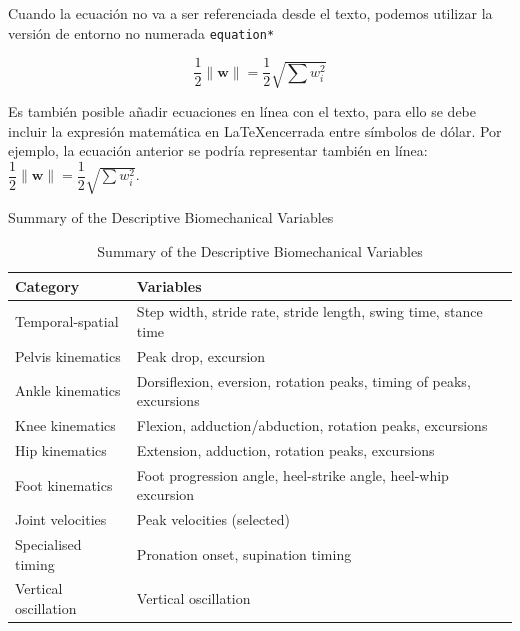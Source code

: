Cuando la ecuación no va a ser referenciada desde el texto, podemos utilizar la versión de entorno no numerada \verb|equation*|

\begin{equation*}
\label{Eq:ejemplo_ecuacion2}
\dfrac{1}{2}\parallel\mathbf{w}\parallel=\dfrac{1}{2}\sqrt{\sum w_{i}^{2}}
\end{equation*}

Es también posible añadir ecuaciones en línea con el texto, para ello se debe incluir la expresión matemática en \LaTeX encerrada entre símbolos de dólar. Por ejemplo, la ecuación anterior se podría representar también en línea: $\dfrac{1}{2}\parallel\mathbf{w}\parallel=\dfrac{1}{2}\sqrt{\sum w_{i}^{2}}$.


\centering
\caption[Descriptive Variables Summary]{Summary of the Descriptive Biomechanical Variables\label{tab:met-desc-variable-init}}
\begin{table}[ht]
    \caption{Summary of the Descriptive Biomechanical Variables}
    \begin{tabular}[t]{lp{}}
    \hline
    Category & Variables \\
    \hline
    Temporal-spatial & Step width, stride rate, stride length, swing time, stance time \\
    Pelvis kinematics & Peak drop, excursion \\
    Ankle kinematics & Dorsiflexion, eversion, rotation peaks, timing of peaks, excursions \\
    Knee kinematics & Flexion, adduction/abduction, rotation peaks, excursions \\
    Hip kinematics & Extension, adduction, rotation peaks, excursions \\
    Foot kinematics & Foot progression angle, heel-strike angle, heel-whip excursion \\
    Joint velocities & Peak velocities (selected) \\
    Specialised timing & Pronation onset, supination timing \\
    Vertical oscillation & Vertical oscillation \\
    \hline
    \end{tabular}
\end{table}